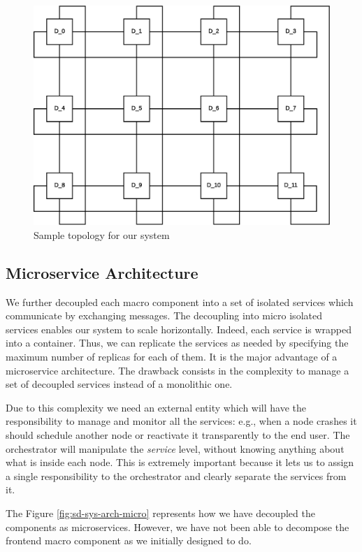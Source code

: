 \begin{figure}[H]
  \centering
  \includegraphics[scale=0.5,keepaspectratio]
    {images/solution/topology.eps}
  \caption{Sample topology for our system}
  \label{fig:sd-sys-arch-topology}
\end{figure}


\subsection{Microservice Architecture}

We further decoupled each macro component into a set of isolated services
which communicate by exchanging messages. The decoupling into micro isolated
services enables our system to scale horizontally. Indeed, each service is wrapped
into a container. Thus, we can replicate
the services as needed by specifying the maximum number of replicas
for each of them.
It is the major advantage
of a microservice architecture.
The drawback consists in the complexity to manage a set of decoupled
services instead of a monolithic one.


Due to this complexity
we need an external entity which
will have the responsibility to manage and monitor all the services:
e.g., when a node crashes it should schedule another node or reactivate it
transparently to the end user.
The orchestrator will
manipulate the \textit{service} level, without knowing anything about
what is inside each node. This is extremely important because it
lets us to assign
a single responsibility to the orchestrator and clearly
separate the services from it.


The Figure \ref{fig:sd-sys-arch-micro} represents how we have decoupled
the components as microservices. However, we have not been able to decompose the
frontend macro component as we initially designed to do.

